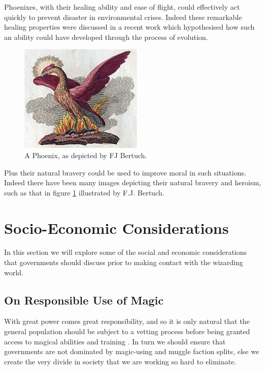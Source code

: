 \documentclass[]{article}
\begin{document}
Phoenixes, with their healing ability and ease of flight, could effectively act quickly to prevent disaster in environmental crises.
Indeed these remarkable healing properties were discussed in a recent work \cite{graham2019anatomy} which hypothesised how such an ability could have developed through the process of evolution.
\begin{figure}[h]
    \centering
    \includegraphics[scale=0.5]{../images/Phoenix_Fabelwesen.jpg}
    \caption{A Phoenix, as depicted by FJ Bertuch. \label{fig:PhoenixFJBertuch}}
\end{figure}
Plus their natural bravery could be used to improve moral in such situations.
Indeed there have been many images depicting their natural bravery and heroism, such as that in figure \ref{fig:PhoenixFJBertuch} illustrated by F.J. Bertuch.

\section{Socio-Economic Considerations}
In this section we will explore some of the social and economic considerations that governments should discuss prior to making contact with the wizarding world.

\subsection*{On Responsible Use of Magic}
With great power comes great responsibility, and so it is only natural that the general population should be subject to a vetting process before being granted access to magical abilities and training \cite{lewis2001chronicles}.
In turn we should ensure that governments are not dominated by magic-using and muggle faction splits, else we create the very divide in society that we are working so hard to eliminate.
\end{document}
